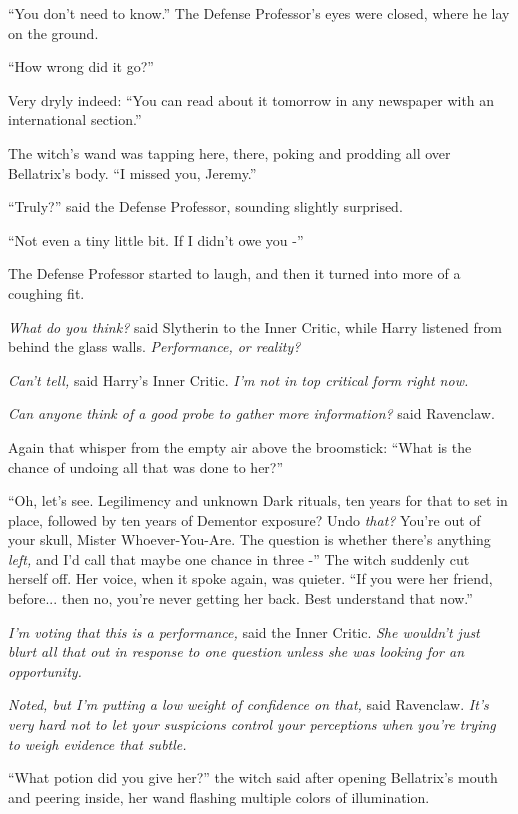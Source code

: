 ``You don't need to know.'' The Defense Professor's eyes were closed,
where he lay on the ground.

``How wrong did it go?''

Very dryly indeed: ``You can read about it tomorrow in any newspaper
with an international section.''

The witch's wand was tapping here, there, poking and prodding all over
Bellatrix's body. ``I missed you, Jeremy.''

``Truly?'' said the Defense Professor, sounding slightly surprised.

``Not even a tiny little bit. If I didn't owe you -''

The Defense Professor started to laugh, and then it turned into more of
a coughing fit.

\emph{What do you think?} said Slytherin to the Inner Critic, while
Harry listened from behind the glass walls. \emph{Performance, or
reality?}

\emph{Can't tell,} said Harry's Inner Critic. \emph{I'm not in top
critical form right now.}

\emph{Can anyone think of a good probe to gather more information?} said
Ravenclaw.

Again that whisper from the empty air above the broomstick: ``What is
the chance of undoing all that was done to her?''

``Oh, let's see. Legilimency and unknown Dark rituals, ten years for that
to set in place, followed by ten years of Dementor exposure? Undo
\emph{that?} You're out of your skull, Mister Whoever-You-Are. The
question is whether there's anything \emph{left,} and I'd call that
maybe one chance in three -'' The witch suddenly cut herself off. Her
voice, when it spoke again, was quieter. ``If you were her friend,
before... then no, you're never getting her back. Best understand
that now.''

\emph{I'm voting that this is a performance,} said the Inner Critic.
\emph{She wouldn't just blurt all that out in response to one question
unless she was looking for an opportunity.}

\emph{Noted, but I'm putting a low weight of confidence on that,} said
Ravenclaw. \emph{It's very hard not to let your suspicions control your
perceptions when you're trying to weigh evidence that subtle.}

``What potion did you give her?'' the witch said after opening
Bellatrix's mouth and peering inside, her wand flashing multiple colors
of illumination.

